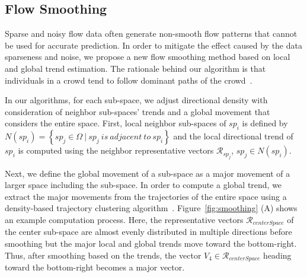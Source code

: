 \subsection{Flow Smoothing}
\label{sec:smoothing}

Sparse and noisy flow data often generate non-smooth flow patterns that cannot be used for accurate prediction. In order to mitigate the effect caused by the data sparseness and noise, we propose a new flow smoothing method based on local and global trend estimation. The rationale behind our algorithm is that individuals in a crowd tend to follow dominant paths of the crowd~\cite{Kok:2015:Crowd}. 

In our algorithms, for each sub-space, we adjust directional density with consideration of neighbor sub-spaces' trends and a global movement that considers the entire space. 
First, local neighbor sub-spaces of $sp_i$ is defined by $N(sp_i) = \left\{sp_j \in \Omega \ |\ sp_j\ is\ adjacent\ to\ sp_i\right\}$ and  the local directional trend of $sp_i$ is computed using the neighbor representative vectors $\mathcal{R}_{sp_j}$, $sp_j \in N(sp_i)$. %

Next, we define the global movement of a sub-space as a major movement of a larger space including the sub-space.
In order to compute a global trend, we extract the major movements from the trajectories of the entire space using a density-based trajectory clustering algorithm~\cite{Lee:2007:Trajectory}.
Figure~\ref{fig:smoothing} (A) shows an example computation process. Here, the representative vectors $\mathcal{R}_{centerSpace}$ of the center sub-space are almost evenly distributed in multiple directions before smoothing but the major local and global trends move toward the bottom-right. Thus, after smoothing based on the trends, the vector $V_4 \in \mathcal{R}_{centerSpace}$ heading toward the bottom-right becomes a major vector.

